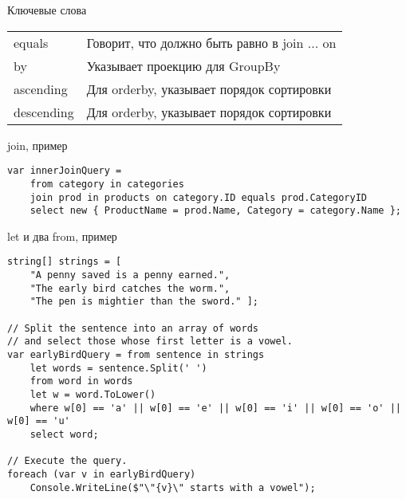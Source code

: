 \documentclass{../../slides-style}
\begin{document}
\begin{frame}{Ключевые слова}
\begin{ssmall}
\begin{tabu} {| X[1 l p] | X[7 l p] |}
                equals      & Говорит, что должно быть равно в join ... on                                                                                                      \\
                by          & Указывает проекцию для GroupBy                                                                                                                    \\
                ascending   & Для orderby, указывает порядок сортировки                                                                                                         \\
                descending  & Для orderby, указывает порядок сортировки                                                                                                         \\
            \end{tabu}
        \end{ssmall}
    \end{frame}

    \begin{frame}[fragile]{join, пример}
        \begin{small}
            \begin{verbatim}
var innerJoinQuery =
    from category in categories
    join prod in products on category.ID equals prod.CategoryID
    select new { ProductName = prod.Name, Category = category.Name };
            \end{verbatim}
        \end{small}
    \end{frame}

    \begin{frame}[fragile]{let и два from, пример}
        \begin{small}
            \begin{verbatim}
string[] strings = [
    "A penny saved is a penny earned.",
    "The early bird catches the worm.",
    "The pen is mightier than the sword." ];

// Split the sentence into an array of words
// and select those whose first letter is a vowel.
var earlyBirdQuery = from sentence in strings
    let words = sentence.Split(' ')
    from word in words
    let w = word.ToLower()
    where w[0] == 'a' || w[0] == 'e' || w[0] == 'i' || w[0] == 'o' || w[0] == 'u'
    select word;

// Execute the query.
foreach (var v in earlyBirdQuery)
    Console.WriteLine($"\"{v}\" starts with a vowel");
            \end{verbatim}
        \end{small}
    \end{frame}
\end{document}
